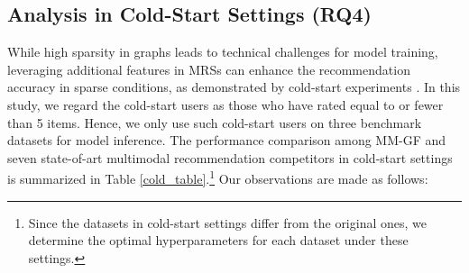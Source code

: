 \documentclass[a4paper,fleqn]{cas-sc}
\renewcommand{\cite}{\citep}
\begin{document}


\subsection{Analysis in Cold-Start Settings (RQ4)}

While high sparsity in graphs leads to technical challenges for model training, leveraging additional features in MRSs can enhance the recommendation accuracy in sparse conditions, as demonstrated by cold-start experiments \cite{zhou2023comprehensive}. In this study, we regard the cold-start users as those who have rated equal to or fewer than 5 items. Hence, we only use such cold-start users on three benchmark datasets for model inference. The performance comparison among \textsf{MM-GF} and seven state-of-art multimodal recommendation competitors in cold-start settings is summarized in Table \ref{cold_table}.\footnote{Since the datasets in cold-start settings differ from the original ones, we determine the optimal hyperparameters for each dataset under these settings.} Our observations are made as follows:
\end{document}
